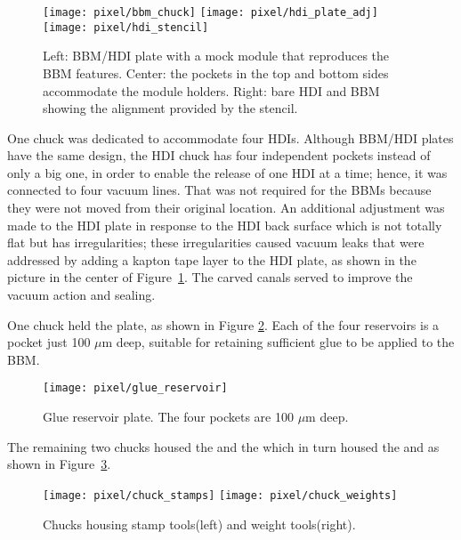 \begin{figure}[!h]
  \centering
  \texttt{[image: pixel/bbm\_chuck]}
  \texttt{[image: pixel/hdi\_plate\_adj]}
  \texttt{[image: pixel/hdi\_stencil]}
  \caption[BBM/HDI plate]{Left: BBM/HDI plate with a mock module that reproduces the BBM features. Center: the pockets in the top and bottom sides accommodate the module holders. Right: bare HDI and BBM showing the alignment provided by the stencil.}\label{fig:bbm_hdi_plates}
\end{figure}

One chuck was dedicated to accommodate four HDIs. Although BBM/HDI plates have the same design, the HDI chuck has four independent pockets instead of only a big one, in order to enable the release of one HDI at a time; hence, it was connected to four vacuum lines. That was not required for the BBMs because they were not moved from their original location. An additional adjustment was made to the HDI plate in response to the HDI back surface which is not totally flat but has irregularities; these irregularities caused vacuum leaks that were addressed by adding a kapton tape layer to the HDI plate, as shown in the picture in the center of Figure~\ref{fig:bbm_hdi_plates}. The carved canals served to improve the vacuum action and sealing.    

One chuck held the  plate, as shown in Figure \ref{fig:glue_reservoir}. Each of the four reservoirs is a pocket just 100 $\mu$m deep, suitable for retaining sufficient glue to be applied to the BBM.  

\begin{figure}[!h]
  \centering
  \texttt{[image: pixel/glue\_reservoir]}
  \caption[Glue reservoir plate]{Glue reservoir plate. The four pockets are 100 $\mu$m deep. }\label{fig:glue_reservoir}
\end{figure}

The remaining two chucks housed the  and the  which in turn housed the  and  as shown in Figure~\ref{fig:st_wt_plates}. 

\begin{figure}[!h]
  \centering
  \texttt{[image: pixel/chuck\_stamps]}
  \texttt{[image: pixel/chuck\_weights]}
  \caption[Stamp and Weight tools in chucks]{Chucks housing stamp tools(left) and weight tools(right).}\label{fig:st_wt_plates}
\end{figure}

